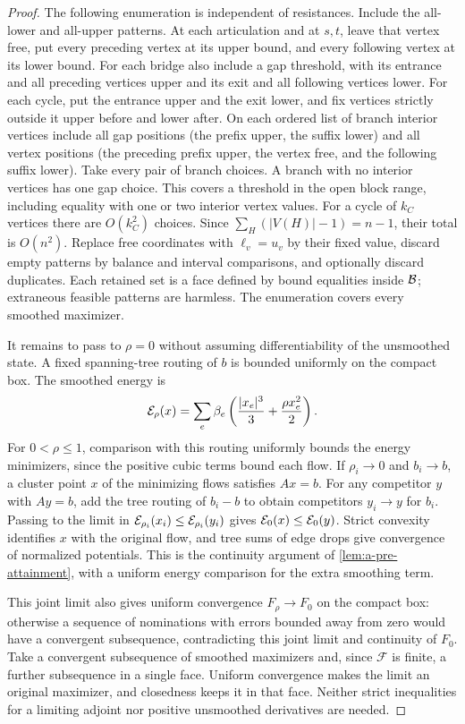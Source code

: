\begin{proof}
The following enumeration is independent of resistances. Include the
all-lower and all-upper patterns. At each articulation and at $s,t$,
leave that vertex free, put every preceding vertex at its upper bound,
and every following vertex at its lower bound. For each bridge also
include a gap threshold, with its entrance and all preceding vertices
upper and its exit and all following vertices lower. For each cycle,
put the entrance upper and the exit lower, and fix vertices strictly
outside it upper before and lower after. On each ordered list of branch
interior vertices include all gap positions (the prefix upper, the
suffix lower) and all vertex positions (the preceding prefix upper,
the vertex free, and the following suffix lower). Take every pair of
branch choices. A branch with no interior vertices has one gap choice.
This covers a threshold in the open block range, including equality
with one or two interior vertex values. For a cycle of $k_C$ vertices
there are $O(k_C^2)$ choices. Since $\sum_H(|V(H)|-1)=n-1$, their total
is $O(n^2)$. Replace free coordinates with $\ell_v=u_v$ by their fixed
value, discard empty patterns by balance and interval comparisons, and
optionally discard duplicates. Each retained set is a face defined by
bound equalities inside $\mathcal{B}$; extraneous feasible patterns are
harmless. The enumeration covers every smoothed maximizer.

It remains to pass to $\rho=0$ without assuming differentiability of
the unsmoothed state. A fixed spanning-tree routing of $b$ is bounded
uniformly on the compact box. The smoothed energy is
\[
 \mathcal{E}_\rho(x)=\sum_e\beta_e
       \left(\frac{|x_e|^3}{3}+\frac{\rho x_e^2}{2}\right).
\]
For $0<\rho\le1$, comparison with this routing uniformly bounds the
energy minimizers, since the positive cubic terms bound each flow.
If $\rho_i\to0$ and $b_i\to b$, a cluster point $x$ of the minimizing
flows satisfies $Ax=b$. For any competitor $y$ with $Ay=b$, add the
tree routing of $b_i-b$ to obtain competitors $y_i\to y$ for $b_i$.
Passing to the limit in
$\mathcal{E}_{\rho_i}(x_i)\le\mathcal{E}_{\rho_i}(y_i)$ gives
$\mathcal{E}_0(x)\le\mathcal{E}_0(y)$. Strict convexity identifies $x$
with the original flow, and tree sums of edge drops give convergence
of normalized potentials. This is the continuity argument of
\cref{lem:a-pre-attainment}, with a uniform energy comparison for the
extra smoothing term.

This joint limit also gives uniform convergence $F_\rho\to F_0$ on the compact box:
otherwise a sequence of nominations with errors bounded away from zero
would have a convergent subsequence, contradicting this joint limit and
continuity of $F_0$. Take a convergent subsequence of smoothed maximizers
and, since $\mathcal F$ is finite, a further subsequence in a single
face. Uniform convergence makes the limit an original maximizer, and
closedness keeps it in that face. Neither strict inequalities for a
limiting adjoint nor positive unsmoothed derivatives are needed.
\end{proof}

